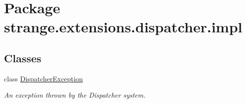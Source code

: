 \hypertarget{namespacestrange_1_1extensions_1_1dispatcher_1_1impl}{\section{Package strange.\-extensions.\-dispatcher.\-impl}
\label{namespacestrange_1_1extensions_1_1dispatcher_1_1impl}
}
\subsection*{Classes}
\begin{DoxyCompactItemize}
\item 
class \hyperlink{classstrange_1_1extensions_1_1dispatcher_1_1impl_1_1_dispatcher_exception}{Dispatcher\-Exception}
\begin{DoxyCompactList}\small\item\em An exception thrown by the Dispatcher system. \end{DoxyCompactList}\end{DoxyCompactItemize}
